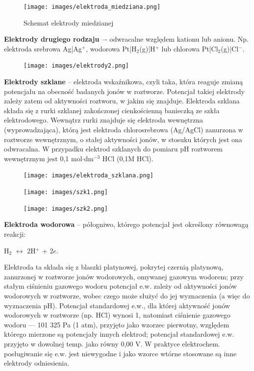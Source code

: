\documentclass{article}
\begin{document}
\begin{figure}[H]
    \centering
    \texttt{[image: images/elektroda\_miedziana.png]}
    \caption{Schemat elektrody miedzianej}
\end{figure}

\textbf{Elektrody drugiego rodzaju} –- odwracalne względem kationu lub anionu.
Np. elektroda srebrowa Ag|Ag$^+$, wodorowa Pt|H$_2$(g)|H$^+$ lub chlorowa Pt|Cl$_2$(g)|Cl$^-$.

\begin{figure}[H]
    \centering
    \texttt{[image: images/elektrody2.png]}
\end{figure}

\textbf{Elektrody szklane} -- elektroda wskaźnikowa, czyli taka, która reaguje zmianą potencjału na obecność badanych jonów w roztworze. Potencjał takiej elektrody zależy zatem od aktywności roztworu, w jakim się znajduje. Elektroda szklana składa się z rurki szklanej zakończonej cienkościenną banieczką ze szkła elektrodowego. Wewnątrz rurki znajduje się elektroda wewnętrzna (wyprowadzająca), którą jest elektroda chlorosrebrowa (Ag/AgCl) zanurzona w roztworze wewnętrznym, o stałej aktywności jonów, w stosuku których jest ona odwracalna. W przypadku elektrod szklanych do pomiaru pH roztworem wewnętrznym jest 0,1 mol$\cdot$dm$^{-3}$ HCl (0,1M HCl).

\begin{figure}[H]
    \centering
    \texttt{[image: images/elektroda\_szklana.png]}
\end{figure}

\begin{figure}[H]
    \centering
    \texttt{[image: images/szk1.png]}
\end{figure}
\begin{figure}[H]
    \centering
    \texttt{[image: images/szk2.png]}
\end{figure}

\textbf{Elektroda wodorowa} -- półogniwo, którego potencjał jest określony równowagą reakcji:
\begin{center}
H$_2$ $\longleftrightarrow$ 2H$^+$ + 2$e$.
\end{center}
Elektroda ta składa się z blaszki platynowej, pokrytej czernią platynową, zanurzonej w roztworze jonów wodorowych, omywanej gazowym wodorem; przy stałym ciśnieniu gazowego wodoru potencjał e.w. zależy od aktywności jonów wodorowych w roztworze, wobec czego może służyć do jej wyznaczenia (a więc do wyznaczenia pH). Potencjał standardowej e.w., dla której aktywność jonów wodorowych w roztworze (np. HCl) wynosi 1, natomiast ciśnienie gazowego wodoru — 101 325 Pa (1 atm), przyjęto jako wzorzec pierwotny, względem którego mierzone są potencjały innych elektrod; potencjał standardowej e.w. przyjęto w dowolnej temp. jako równy 0,00 V. W praktyce elektrochem. posługiwanie się e.w. jest niewygodne i jako wzorce wtórne stosowane są inne elektrody odniesienia.
\end{document}
